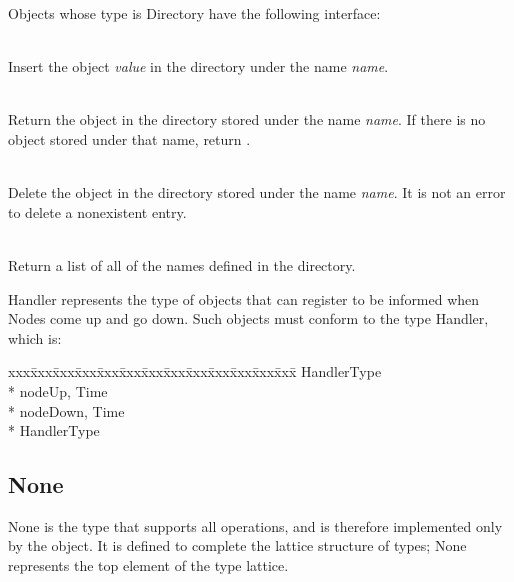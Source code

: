 \noindent Objects whose type is Directory have the following
interface:

\begin{desc}
  \item[\kw{operation} insert\/\LB{}name \CO{} \tn{String}, value \CO{} \tn{Any}\/\RB{}]~\\
    Insert the object {\it value} in the directory under the name {\it name}.
  \item[\kw{function} lookup\/\LB{}name \CO{} \tn{String}\/\RB{} \returns{} \/\LB{}\tn{Any}\/\RB{}]~\\
    Return the object in the directory stored under the name {\it name}.  If
    there is no object stored under that name, return .
  \item[\kw{operation} delete\/\LB{}\tn{String}\/\RB{}]~\\
    Delete the object in the directory stored under the name {\it name}.
    It is not an error to delete a nonexistent entry.
  \item[\kw{function} list \returns{} \/\LB{}ImmutableVectorOfString\/\RB{}]~\\
    Return a list of all of the names defined in the directory.
\end{desc}

Handler represents the type of objects that can register to be informed when
Nodes come up and go down.  Such objects must conform to the type Handler,
which is:

{\it\begin{minipage}{\textwidth}\begin{tabbing}
xxx\=xxx\=xxx\=xxx\=xxx\=xxx\=xxx\=xxx\=xxx\=xxx\=xxx\=xxx\=xxx\=\+\kill%
 HandlerType\+\\*{}%
   nodeUp\/\LB{}, Time\/\RB{}\\*{}%
   nodeDown\/\LB{}, Time\/\RB{}\-\\*{}%
 HandlerType
\end{tabbing}\end{minipage}}

\subsection{None}
\label{builtin None}
None is the type that supports all operations, and is therefore
implemented only by the  object.  It is defined to complete the
lattice structure of \emd{} types; None represents the top element of the
type lattice.

